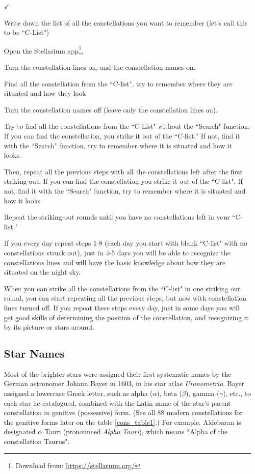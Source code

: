 \documentclass[a4paper,12pt]{extarticle}
\newenvironment{teqn}[1][Check / technique]
{%
	\begin{tcolorbox}[
		enhanced,
		breakable,
		colframe=teqnTeal,
		colback=teqnPale,
		colbacktitle=teqnTeal,
		coltitle=white,
		fonttitle=\bfseries,
		title={\(\checkmark\)\enspace #1},
		boxrule=0.7pt,
		arc=2mm,
		boxsep=0pt,
		left=3mm, right=3mm,
		top=2mm, bottom=2mm,
		toptitle=1.5mm, bottomtitle=1.5mm,
		before skip=8pt, after skip=8pt
		]
		\begin{list}{\textcolor{teqnTeal}{\(\checkmark\)}}{%
				\setlength{\leftmargin}{1.6em}%
				\setlength{\labelwidth}{1.1em}%
				\setlength{\labelsep}{0.5em}%
				\setlength{\topsep}{0pt}%
				\setlength{\partopsep}{0pt}%
				\setlength{\parsep}{0pt}%
				\setlength{\itemsep}{3pt}%
			}%
		}
		{%
		\end{list}
	\end{tcolorbox}
}
\begin{document}
\begin{teqn}[Learning how to recognize constellations]
	\item Write down the list of all the constellations you want to remember (let's call this to be ``C-List")
	\item Open the Stellarium app\footnote{Download from: \url{https://stellarium.org/}},
	\item Turn the constellation lines on, and the constellation names on.
	\item Find all the constellation from the ``C-list", try to remember where they are situated and how they look
	\item Turn the constellation names off (leave only the constellation lines on).
	\item Try to find all the constellations from the ``C-List" without the ``Search" function. If you can find the constellation, you strike it out of the ``C-list." If not, find it with the ``Search" function, try to remember where it is situated and how it looks.
	\item Then, repeat all the previous steps with all the constellations left after the first striking-out. If you can find the constellation you strike it out of the ``C-list". If not, find it with the ``Search" function, try to remember where it is situated and how it looks
	\item Repeat the striking-out rounds until you have no constellations left in your ``C-list."
	\item If you every day repeat steps 1-8 (each day you start with blank ``C-list" with no constellations struck out), just in 4-5 days you will be able to recognize the constellations lines and will have the basic knowledge about how they are situated on the night sky.
	\item When you can strike all the constellations from the ``C-list" in one striking out round, you can start repeating all the previous steps, but now with constellation lines turned off. If you repeat these steps every day, just in some days you will get good skills of determining the position of the constellation, and recognizing it by its picture or stars around.
\end{teqn}


\subsection{Star Names}

Most of the brighter stars were assigned their first systematic names by the German astronomer Johann Bayer in 1603, in his star atlas \textit{Uranometria}. Bayer assigned a lowercase Greek letter, such as alpha ($\alpha$), beta ($\beta$), gamma ($\gamma$), etc., to each star he catalogued, combined with the Latin name of the star’s parent constellation in genitive (possessive) form. (See all 88 modern constellations for the genitive forms later on the table \ref{cons_table1}.) For example, Aldebaran is designated $\alpha$ Tauri (pronounced \textit{Alpha Tauri}), which means ``Alpha of the constellation Taurus".\\
\end{document}
